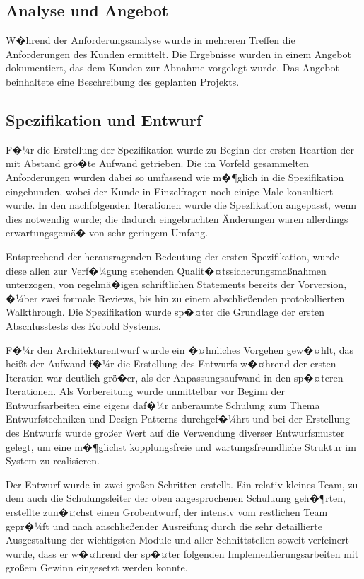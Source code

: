 \documentclass[a4paper,titlepage,12pt,ngerman]{scrbook}
\begin{document}
\subsection{Analyse und Angebot}
W�hrend der Anforderungsanalyse wurde in mehreren Treffen die
Anforderungen des Kunden ermittelt. Die Ergebnisse wurden in einem
Angebot dokumentiert, das dem Kunden zur Abnahme vorgelegt wurde. Das
Angebot beinhaltete eine Beschreibung des geplanten Projekts.

\subsection{Spezifikation und Entwurf}
F�¼r die Erstellung der Spezifikation wurde zu Beginn der ersten Iteartion der mit Abstand
grö�te Aufwand getrieben. Die im Vorfeld gesammelten Anforderungen wurden dabei so umfassend
wie m�¶glich in die Spezifikation eingebunden, wobei der Kunde in Einzelfragen noch einige
Male konsultiert wurde. In den nachfolgenden Iterationen wurde die Spezfikation angepasst,
wenn dies notwendig wurde; die dadurch eingebrachten Änderungen waren allerdings erwartungsgemä� 
von sehr geringem Umfang.\par
Entsprechend der herausragenden Bedeutung der ersten Spezifikation, wurde diese allen zur Verf�¼gung
stehenden Qualit�¤tssicherungsmaßnahmen unterzogen, von regelmä�igen schriftlichen Statements bereits
der Vorversion, �¼ber zwei formale Reviews, bis hin zu einem abschließenden protokollierten Walkthrough.
Die Spezifikation wurde sp�¤ter die Grundlage der ersten Abschlusstests des Kobold Systems.\par
F�¼r den Architekturentwurf wurde ein �¤hnliches Vorgehen gew�¤hlt, das heißt der Aufwand f�¼r die Erstellung
des Entwurfs w�¤hrend der ersten Iteration war deutlich grö�er, als der Anpassungsaufwand in den sp�¤teren
Iterationen. Als Vorbereitung wurde unmittelbar vor Beginn der Entwurfsarbeiten eine eigens daf�¼r anberaumte
Schulung zum Thema Entwurfstechniken und Design Patterns durchgef�¼hrt und bei der Erstellung des Entwurfs
wurde großer Wert auf die Verwendung diverser Entwurfsmuster gelegt, um eine m�¶glichst kopplungsfreie und
wartungsfreundliche Struktur im System zu realisieren.\par
Der Entwurf wurde in zwei großen Schritten erstellt. Ein relativ kleines Team, zu dem auch die Schulungsleiter
der oben angesprochenen Schuluung geh�¶rten, erstellte zun�¤chst einen Grobentwurf, der intensiv vom restlichen 
Team gepr�¼ft und nach anschließender Ausreifung durch die sehr detaillierte Ausgestaltung der wichtigsten Module 
und aller Schnittstellen soweit verfeinert wurde, dass er w�¤hrend der sp�¤ter folgenden Implementierungsarbeiten 
mit großem Gewinn eingesetzt werden konnte.
\end{document}
